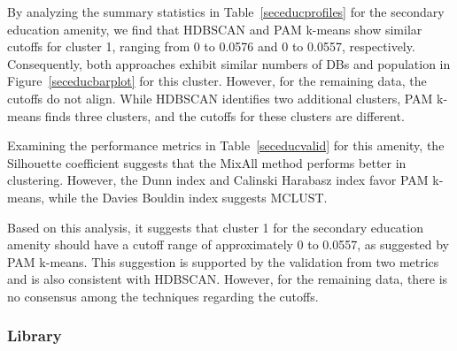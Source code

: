 \documentclass[11pt, a4paper]{article}
\begin{document}
By analyzing the summary statistics in Table~\ref{seceducprofiles} for the secondary education amenity, we find that HDBSCAN and PAM k-means show similar cutoffs for cluster 1, ranging from 0 to 0.0576 and 0 to 0.0557, respectively. Consequently, both approaches exhibit similar numbers of DBs and population in Figure~\ref{seceducbarplot} for this cluster. However, for the remaining data, the cutoffs do not align. While HDBSCAN identifies two additional clusters, PAM k-means finds three clusters, and the cutoffs for these clusters are different.
\par
Examining the performance metrics in Table~\ref{seceducvalid} for this amenity, the Silhouette coefficient suggests that the MixAll method performs better in clustering. However, the Dunn index and Calinski Harabasz index favor PAM k-means, while the Davies Bouldin index suggests MCLUST.
\par
Based on this analysis, it suggests that cluster 1 for the secondary education amenity should have a cutoff range of approximately 0 to 0.0557, as suggested by PAM k-means. This suggestion is supported by the validation from two metrics and is also consistent with HDBSCAN. However, for the remaining data, there is no consensus among the techniques regarding the cutoffs.



\subsubsection{Library}
\end{document}
